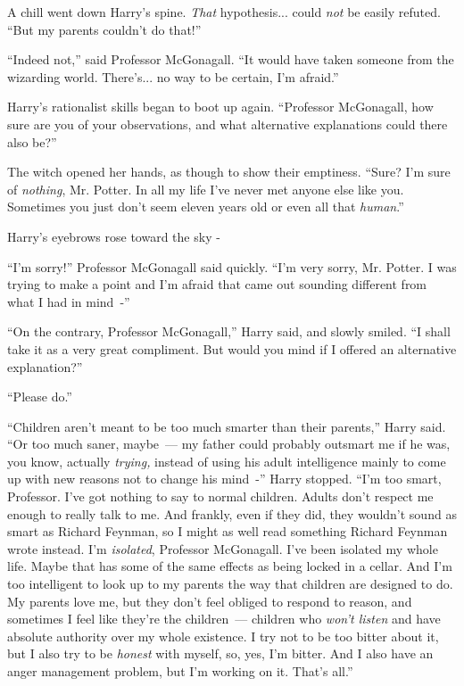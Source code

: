 A chill went down Harry's spine. \emph{That} hypothesis... could \emph{not} be easily refuted. ``But my parents couldn't do that!''

``Indeed not,'' said Professor McGonagall. ``It would have taken someone from the wizarding world. There's... no way to be certain, I'm afraid.''

Harry's rationalist skills began to boot up again. ``Professor McGonagall, how sure are you of your observations, and what alternative explanations could there also be?''

The witch opened her hands, as though to show their emptiness. ``Sure? I'm sure of \emph{nothing}, Mr. Potter. In all my life I've never met anyone else like you. Sometimes you just don't seem eleven years old or even all that \emph{human}.''

Harry's eyebrows rose toward the sky -

``I'm sorry!'' Professor McGonagall said quickly. ``I'm very sorry, Mr. Potter. I was trying to make a point and I'm afraid that came out sounding different from what I had in mind~-''

``On the contrary, Professor McGonagall,'' Harry said, and slowly smiled. ``I shall take it as a very great compliment. But would you mind if I offered an alternative explanation?''

``Please do.''

``Children aren't meant to be too much smarter than their parents,'' Harry said. ``Or too much saner, maybe~--- my father could probably outsmart me if he was, you know, actually \emph{trying,} instead of using his adult intelligence mainly to come up with new reasons not to change his mind~-'' Harry stopped. ``I'm too smart, Professor. I've got nothing to say to normal children. Adults don't respect me enough to really talk to me. And frankly, even if they did, they wouldn't sound as smart as Richard Feynman, so I might as well read something Richard Feynman wrote instead. I'm \emph{isolated}, Professor McGonagall. I've been isolated my whole life. Maybe that has some of the same effects as being locked in a cellar. And I'm too intelligent to look up to my parents the way that children are designed to do. My parents love me, but they don't feel obliged to respond to reason, and sometimes I feel like they're the children~--- children who \emph{won't listen} and have absolute authority over my whole existence. I try not to be too bitter about it, but I also try to be \emph{honest} with myself, so, yes, I'm bitter. And I also have an anger management problem, but I'm working on it. That's all.''


